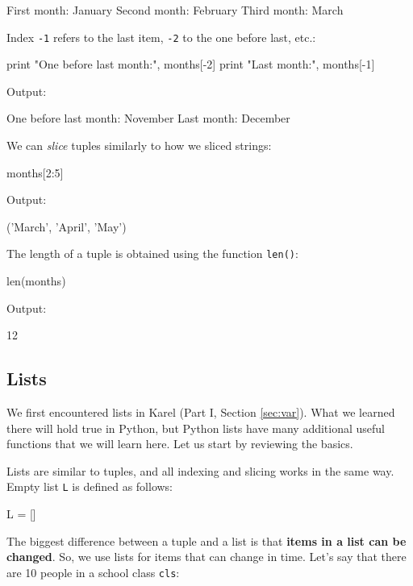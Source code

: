 \begin{bluecode}
First month: January
Second month: February
Third month: March
\end{bluecode}
Index {\tt -1} refers to the last item, {\tt -2} to the one before last, etc.:

\begin{bluecode}
print "One before last month:", months[-2]
print "Last month:", months[-1]
\end{bluecode}
Output:

\begin{bluecode}
One before last month: November
Last month: December
\end{bluecode}

\noindent
We can {\em slice} tuples similarly to how we sliced strings:

\begin{bluecode}
months[2:5]
\end{bluecode}
Output:

\begin{bluecode}
('March', 'April', 'May')
\end{bluecode}
The length of a tuple is obtained using the function {\tt len()}:

\begin{bluecode}
len(months)
\end{bluecode}
Output:

\begin{bluecode}
12
\end{bluecode}

\subsection{Lists}

We first encountered lists in Karel (Part I, Section \ref{sec:var}). What we
learned there will hold true in Python, but Python lists have many additional 
useful functions that we will learn here. Let us start by reviewing the basics.
  
Lists are similar to tuples, and all indexing and slicing works in the same way. 
Empty list {\tt L} is defined as follows:

\begin{bluecode}
L = []
\end{bluecode}
The biggest difference between a tuple 
and a list is that {\bf items in a list can be changed}. So, we use
lists for items that can change in time. Let's say that there are 
10 people in a school class {\tt cls}:

